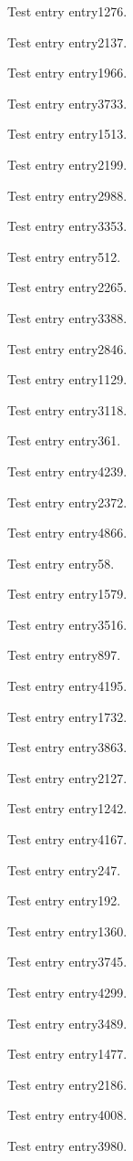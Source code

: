 Test entry \gls{entry1276}.

Test entry \gls{entry2137}.

Test entry \gls{entry1966}.

Test entry \gls{entry3733}.

Test entry \gls{entry1513}.

Test entry \gls{entry2199}.

Test entry \gls{entry2988}.

Test entry \gls{entry3353}.

Test entry \gls{entry512}.

Test entry \gls{entry2265}.

Test entry \gls{entry3388}.

Test entry \gls{entry2846}.

Test entry \gls{entry1129}.

Test entry \gls{entry3118}.

Test entry \gls{entry361}.

Test entry \gls{entry4239}.

Test entry \gls{entry2372}.

Test entry \gls{entry4866}.

Test entry \gls{entry58}.

Test entry \gls{entry1579}.

Test entry \gls{entry3516}.

Test entry \gls{entry897}.

Test entry \gls{entry4195}.

Test entry \gls{entry1732}.

Test entry \gls{entry3863}.

Test entry \gls{entry2127}.

Test entry \gls{entry1242}.

Test entry \gls{entry4167}.

Test entry \gls{entry247}.

Test entry \gls{entry192}.

Test entry \gls{entry1360}.

Test entry \gls{entry3745}.

Test entry \gls{entry4299}.

Test entry \gls{entry3489}.

Test entry \gls{entry1477}.

Test entry \gls{entry2186}.

Test entry \gls{entry4008}.

Test entry \gls{entry3980}.

